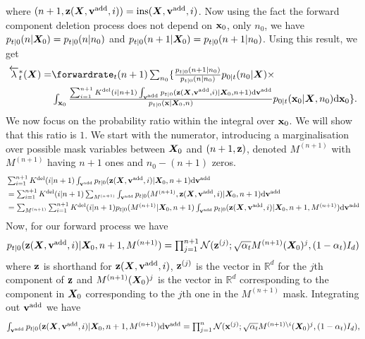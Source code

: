 where $(n+1, \mathbf{z}({\bm{X}}, {\mathbf{v}}^{\textup{add}}, i)) = \text{ins}({\bm{X}}, {\mathbf{v}}^{\textup{add}}, i)$. Now using the fact
the forward component deletion process does not depend on ${\mathbf{x}}_0$, only $n_0$, we
have $p_{t|0}(n | {\bm{X}}_0) = p_{t|0}(n | n_0)$ and
$p_{t|0}(n+1 | {\bm{X}}_0) = p_{t|0}(n+1 | n_0)$. Using this result, we get 
\begin{align}
   \backwardrate_t^*(\mX) = &\textstyle \forwardrate_t(n+1) \sum_{n_0} \{ \frac{p_{t|0}(n+1 | n_0)}{p_{t|0}(n | n_0)} p_{0|t}(n_0 | \mX) \times \\
\label{eq:backwardrateparamProofLine1}
   &\textstyle   \int_{\rvx_0}  \frac{\sum_{i=1}^{n+1} K^{\text{del}}(i | n+1) \int_{\yadd} p_{t|0}(\z(\mX, \yadd, i) | \mX_0, n+1) \rmd \yadd}{p_{t|0}(\rvx | \mX_0, n)} p_{0|t}(\rvx_0 | \mX, n_0)\rmd \rvx_0 \} . 
\end{align}
We now focus on the probability ratio within the integral over ${\mathbf{x}}_0$. We will show that this ratio is $1$. We start with the numerator, introducing a marginalisation over possible mask variables between ${\bm{X}}_0$ and $(n+1, \mathbf{z})$, denoted $M^{(n+1)}$ with $M^{(n+1)}$ having $n+1$ ones and $n_0 - (n+1)$ zeros.
\begin{align}
    &\textstyle \sum_{i=1}^{n+1} K^{\text{del}}(i | n+1) \int_{{\mathbf{v}}^{\textup{add}}} p_{t|0}(\mathbf{z}({\bm{X}}, {\mathbf{v}}^{\textup{add}}, i) | {\bm{X}}_0, n+1) \mathrm{d} {\mathbf{v}}^{\textup{add}} \\
    &\textstyle  = \sum_{i=1}^{n+1} K^{\text{del}}(i | n+1) \sum_{M^{(n+1)}} \int_{{\mathbf{v}}^{\textup{add}}} p_{t|0}(M^{(n+1)}, \mathbf{z}({\bm{X}}, {\mathbf{v}}^{\textup{add}}, i) | {\bm{X}}_0, n+1) \mathrm{d} {\mathbf{v}}^{\textup{add}} \\
    &\textstyle  = \sum_{M^{(n+1)}} \sum_{i=1}^{n+1} K^{\text{del}}(i | n+1)  p_{t|0}(M^{(n+1)} | {\bm{X}}_0, n+1)  \int_{{\mathbf{v}}^{\textup{add}}} p_{t|0}(\mathbf{z}({\bm{X}}, {\mathbf{v}}^{\textup{add}}, i) | {\bm{X}}_0, n+1, M^{(n+1)}) \mathrm{d} {\mathbf{v}}^{\textup{add}} 
\end{align}
Now, for our forward process we have
\begin{equation}
\textstyle    p_{t|0}(\mathbf{z} ({\bm{X}}, {\mathbf{v}}^{\textup{add}}, i) | {\bm{X}}_0, n+1, M^{(n+1)}) = \prod_{j=1}^{n+1} \mathcal{N}( \mathbf{z}^{(j)} ; \sqrt{\alpha_t} M^{(n+1)}({\bm{X}}_0)^j, (1-\alpha_t) I_d)
\end{equation}
where $\mathbf{z}$ is shorthand for $\mathbf{z}({\bm{X}}, {\mathbf{v}}^{\textup{add}}, i)$, $\mathbf{z}^{(j)}$ is the vector in $\mathbb{R}^d$ for the $j$th component of $\mathbf{z}$ and $M^{(n+1)}({\bm{X}}_0)^j$ is the vector in $\mathbb{R}^d$ corresponding to the component in ${\bm{X}}_0$ corresponding to the $j$th one in the $M^{(n+1)}$ mask. Integrating out ${\mathbf{v}}^{\textup{add}}$ we have
\begin{equation}
\textstyle    \int_{{\mathbf{v}}^{\textup{add}}} p_{t|0}(\mathbf{z}({\bm{X}}, {\mathbf{v}}^{\textup{add}}, i) | {\bm{X}}_0, n+1, M^{(n+1)}) \mathrm{d} {\mathbf{v}}^{\textup{add}}  = \prod_{j=1}^{n}\mathcal{N}( {\mathbf{x}}^{(j)} ; \sqrt{\alpha_t} M^{(n+1) \backslash i}({\bm{X}}_0)^j, (1-\alpha_t) I_d) ,
\end{equation}
